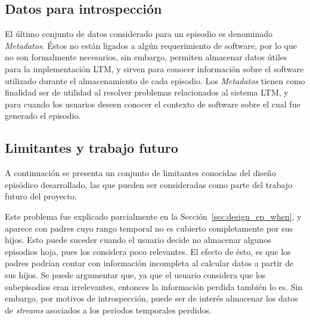 \subsection{Datos para introspección}

El último conjunto de datos considerado para un episodio es denominado \textit{Metadatos}. Éstos no están ligados a algún requerimiento de software, por lo que no son formalmente necesarios, sin embargo, permiten almacenar datos útiles para la implementación LTM, y sirven para conocer información sobre el software utilizado durante el almacenamiento de cada episodio. Los \textit{Metadatos} tienen como finalidad ser de utilidad al resolver problemas relacionados al sistema LTM, y para cuando los usuarios deseen conocer el contexto de software sobre el cual fue generado el episodio.


\subsection{Limitantes y trabajo futuro}

A continuación se presenta un conjunto de limitantes conocidas del diseño episódico desarrollado, las que pueden ser consideradas como parte del trabajo futuro del proyecto.

Este problema fue explicado parcialmente en la Sección~\ref{sec:design_ep_when}, y aparece con padres cuyo rango temporal no es cubierto completamente por sus hijos. Esto puede suceder cuando el usuario decide no almacenar algunos episodios hoja, pues los considera poco relevantes. El efecto de ésto, es que los padres podrían contar con información incompleta al calcular datos a partir de sus hijos. Se puede argumentar que, ya que el usuario considera que los subepisodios eran irrelevantes, entonces la información perdida también lo es. Sin embargo, por motivos de introspección, puede ser de interés almacenar los datos de \textit{streams} asociados a los periodos temporales perdidos.


